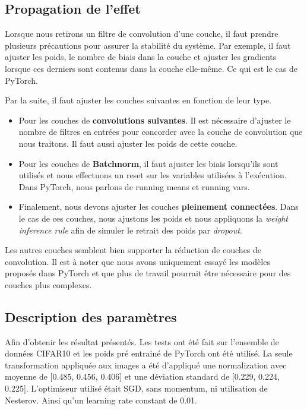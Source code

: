 \documentclass[12pt]{article}
\begin{document}
\subsection{Propagation de l’effet}
Lorsque nous retirons un filtre de convolution d’une couche, il faut prendre plusieurs précautions pour assurer la stabilité du système. Par exemple, il faut ajuster les poids, le nombre de biais dans la couche et ajuster les gradients lorsque ces derniers sont contenus dans la couche elle-même. Ce qui est le cas de PyTorch.

Par la suite, il faut ajuster les couches suivantes en fonction de leur type.
\begin{itemize}[noitemsep, noitemsep, label={}]
	\item Pour les couches de \textbf{convolutions suivantes}. Il est nécessaire d’ajuster le nombre de filtres en entrées pour concorder avec la couche de convolution que nous traitons. Il faut aussi ajuster les poids de cette couche. 
	\item Pour les couches de \textbf{Batchnorm}, il faut ajuster les biais lorsqu'ils sont utilisés et nous effectuons un reset sur les variables utilisées à l’exécution. Dans PyTorch, nous parlons de running means et running vars. 
	\item Finalement, nous devons ajuster les couches \textbf{pleinement connectées}. Dans le cas de ces couches, nous ajustons les poids et nous appliquons la \textit{weight inference rule}\cite{weightinference} afin de simuler le retrait des poids par \textit{dropout}. 
\end{itemize}
\newpage
Les autres couches semblent bien supporter la réduction de couches de convolution. Il est à noter que nous avons uniquement essayé les modèles proposés dans PyTorch et que plus de travail pourrait être nécessaire pour des couches plus complexes. 

\subsection{Description des paramètres}
Afin d'obtenir les résultat présentés. Les tests ont été fait sur l'ensemble de données CIFAR10 et les poids pré entrainé de PyTorch ont été utilisé. La seule transformation appliquée aux images a été d'appliqué une normalization avec moyenne de [0.485, 0.456, 0.406] et une déviation standard de [0.229, 0.224, 0.225].
L'optimiseur utilisé était SGD, sans momentum, ni utilisation de Nesterov. Ainsi qu'un learning rate constant de 0.01.
\end{document}
